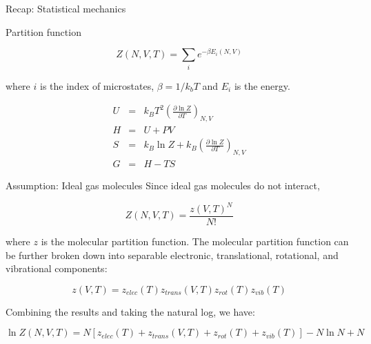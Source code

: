 \documentclass[aspectratio=169]{beamer}
\begin{document}
\begin{frame}{Recap: Statistical mechanics}

Partition function

\begin{equation*}
    Z(N, V, T) = \sum_{i} e^{-\beta E_i(N,V)} 
\end{equation*}

where $i$ is the index of microstates, $\beta = 1/k_b T$ and $E_i$ is the energy.

\begin{eqnarray*}
    U & = & k_B T^2 \left( \frac{\partial \ln Z} {\partial T} \right)_{N,V}\\
    H & = & U + PV\\
    S & = & k_B \ln Z + k_B \left( \frac{\partial \ln Z} {\partial T} \right)_{N,V}\\
    G & = & H - TS
\end{eqnarray*}
\end{frame} 

\begin{frame}{Assumption: Ideal gas molecules}
Since ideal gas molecules do not interact,

\begin{equation*}
    Z(N, V, T) = \frac{z(V,T)^N}{N!} 
\end{equation*}

where $z$ is the molecular partition function.\newline
\newline
The molecular partition function can be further broken down into separable electronic, translational, rotational, and vibrational components:

\begin{equation*}
    z(V,T) = z_{elec}(T)z_{trans}(V, T)z_{rot}(T)z_{vib}(T)
\end{equation*}

Combining the results and taking the natural log, we have:


\begin{equation*}
    \ln Z(N, V, T) = N[z_{elec}(T)+z_{trans}(V, T)+z_{rot}(T)+z_{vib}(T)]-N\ln N + N
\end{equation*}

\end{frame} 
\end{document}
